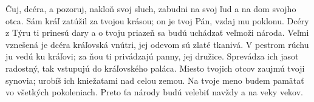 Čuj, dcéra, a pozoruj, nakloň svoj sluch,
zabudni na svoj ľud a na dom svojho otca.
\versseparator
Sám kráľ zatúžil za tvojou krásou;
on je tvoj Pán, vzdaj mu poklonu.
\versseparator
Dcéry z Týru ti prinesú dary
a o tvoju priazeň sa budú uchádzať veľmoži národa.
\versseparator
Veľmi vznešená je dcéra kráľovská vnútri,
jej odevom sú zlaté tkanivá.
V pestrom rúchu ju vedú ku kráľovi;
\versseparator
za ňou ti privádzajú panny, jej družice.
\versseparator
Sprevádza ich jasot radostný,
tak vstupujú do kráľovského paláca.
\versseparator
Miesto tvojich otcov zaujmú tvoji synovia;
urobíš ich kniežatami nad celou zemou.
\versseparator
Na tvoje meno budem pamätať
vo všetkých pokoleniach.
\versseparator
Preto ťa národy budú velebiť navždy
a na veky vekov.